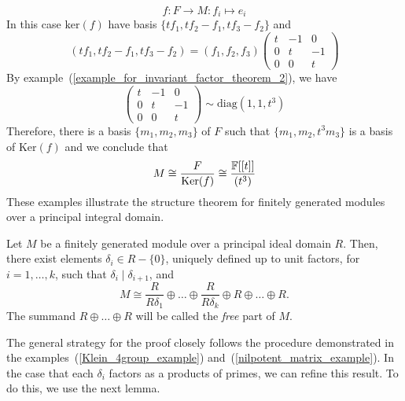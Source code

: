         \begin{equation}
            f:F\rightarrow M: f_i\mapsto e_i
        \end{equation}
        In this case $\text{ker}(f)$ have basis $\{tf_1,tf_2-f_1,tf_3-f_2\}$ and
        \begin{equation}
            (tf_1,tf_2-f_1,tf_3-f_2)=(f_1,f_2,f_3)\begin{pmatrix}
                t&-1&0\\
                0&t&-1\\
                0&0&t
            \end{pmatrix}
        \end{equation}
        By example~(\ref{example_for_invariant_factor_theorem_2}), we have 
        \begin{equation}
            \begin{pmatrix}
                t&-1&0\\
                0&t&-1\\
                0&0&t
                 \end{pmatrix}\sim\text{diag}(1,1,t^3)
        \end{equation}
        Therefore, there is a basis $\{m_1,m_2,m_3\}$ of $F$ such that $\{m_1,m_2,t^3m_3\}$ is a basis of $\text{Ker}(f)$ and we conclude that 
        \begin{equation}
            M\cong \frac{F}{\text{Ker}(f)}\cong\frac{\mathbb{F}[[t]]}{(t^3)}
        \end{equation}
These examples illustrate the structure theorem for finitely generated modules over a principal integral domain.
\begin{dang}
\begin{theorem}\label{structure_theorem_for_modules_over_PID}
    \cite{curtis1966representation}
    Let $M$ be a finitely generated module over a principal ideal domain $R$. Then, there exist elements $\delta_i \in R - \{0\}$, uniquely defined up to unit factors, for $i = 1, \dots, k$, such that $\delta_i \mid \delta_{i+1}$, and
    \begin{equation}
        M \cong \frac{R}{R\delta_1} \oplus \dots \oplus \frac{R}{R\delta_k} \oplus R \oplus \dots \oplus R.
    \end{equation}
    The summand $R \oplus \dots \oplus R$ will be called the \textit{free} part of $M$.
\end{theorem}
\end{dang}
The general strategy for the proof closely follows the procedure demonstrated in the examples~(\ref{Klein_4group_example}) and~(\ref{nilpotent_matrix_example}). In the case that each $\delta_i$ factors as a products of primes, we can refine this result. To do this, we use the next lemma.
